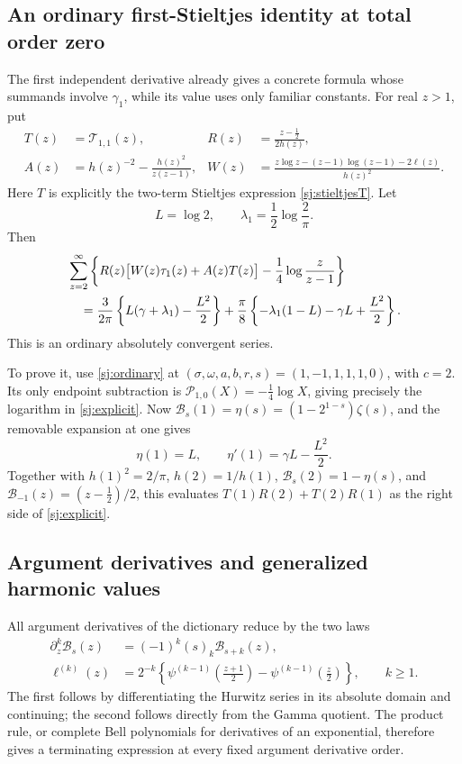 \documentclass[11pt,letterpaper]{article}
\numberwithin{equation}{section}
\theoremstyle{definition}
\theoremstyle{remark}
\begin{document}
\subsection{An ordinary first-Stieltjes identity at total order zero}

The first independent derivative already gives a concrete formula whose
summands involve \(\gamma_1\), while its value uses only familiar constants.
For real \(z>1\), put
\begin{align*}
 T(z)&=\mathcal T_{1,1}(z),&
 R(z)&=\frac{z-\frac12}{2h(z)},\\
 A(z)&=h(z)^{-2}-\frac{h(z)^2}{z(z-1)},&
 W(z)&=\frac{z\log z-(z-1)\log(z-1)-2\ell(z)}{h(z)^2}.
\end{align*}
Here \(T\) is explicitly the two-term Stieltjes expression
\eqref{sj:stieltjesT}. Let
\[
 L=\log2,\qquad \lambda_1=\frac12\log\frac2\pi .
\]
Then
\begin{align}
 &\sum_{z=2}^{\infty}
   \left\{
      R(z)\bigl[W(z)\tau_1(z)+A(z)T(z)\bigr]
          -\frac14\log\frac z{z-1}
   \right\}\notag\\
 &\quad=
 \frac{3}{2\pi}\left\{L(\gamma+\lambda_1)-\frac{L^2}{2}\right\}
 +\frac{\pi}{8}\left\{-\lambda_1(1-L)-\gamma L+\frac{L^2}{2}\right\}.
 \label{sj:explicit}
\end{align}
This is an ordinary absolutely convergent series.

To prove it, use \eqref{sj:ordinary} at
\((\sigma,\omega,a,b,r,s)=(1,-1,1,1,1,0)\), with \(c=2\).
Its only endpoint subtraction is
\(\mathcal P_{1,0}(X)=-\frac14\log X\), giving precisely the logarithm
in \eqref{sj:explicit}. Now
\(\mathcal B_s(1)=\eta(s)=(1-2^{1-s})\zeta(s)\), and the removable
expansion at one gives
\[
 \eta(1)=L,\qquad \eta'(1)=\gamma L-\frac{L^2}{2}.
\]
Together with \(h(1)^2=2/\pi\), \(h(2)=1/h(1)\),
\(\mathcal B_s(2)=1-\eta(s)\), and
\(\mathcal B_{-1}(z)=(z-\frac12)/2\), this evaluates
\(T(1)R(2)+T(2)R(1)\) as the right side of \eqref{sj:explicit}.

\subsection{Argument derivatives and generalized harmonic values}

All argument derivatives of the dictionary reduce by the two laws
\begin{align}
 \partial_z^k\mathcal B_s(z)
    &=(-1)^k(s)_k\mathcal B_{s+k}(z),\label{sj:Barg}\\
 \ell^{(k)}(z)
    &=2^{-k}\left\{
       \psi^{(k-1)}\!\left(\frac{z+1}{2}\right)
       -\psi^{(k-1)}\!\left(\frac z2\right)\right\},
       \qquad k\ge1. \label{sj:ellarg}
\end{align}
The first follows by differentiating the Hurwitz series in its absolute
domain and continuing; the second follows directly from the Gamma quotient.
The product rule, or complete Bell polynomials for derivatives of an
exponential, therefore gives a terminating expression at every fixed
argument derivative order.
\end{document}

